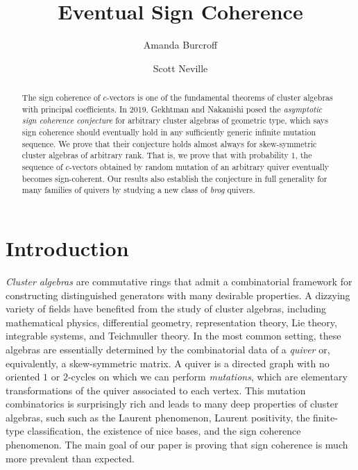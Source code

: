 \documentclass[12pt]{amsart}
\title{Eventual Sign Coherence}
\author{Amanda Burcroff}
\author{Scott Neville}
\theoremstyle{definition}
\theoremstyle{remark}
\numberwithin{equation}{section}
\begin{document}
\begin{abstract} The sign coherence of $c$-vectors is one of the fundamental theorems of cluster algebras with principal coefficients.  In 2019, Gekhtman and Nakanishi posed the \emph{asymptotic sign coherence conjecture} for arbitrary cluster algebras of geometric type, which says sign coherence should eventually hold in any sufficiently generic infinite mutation sequence.  
We prove that their conjecture holds almost always for skew-symmetric cluster algebras of arbitrary rank.  That is, we prove that with probability $1$, the sequence of $c$-vectors obtained by random mutation of an arbitrary  quiver eventually becomes sign-coherent. 
Our results also establish the conjecture in full generality for many families of quivers by studying a new class of \emph{brog} quivers.
\end{abstract}



\maketitle


\section{Introduction}


\emph{Cluster algebras} are commutative rings that admit a combinatorial framework for constructing distinguished generators with many desirable properties.  A dizzying variety of fields have benefited from the study of cluster algebras, including mathematical physics, differential geometry, representation theory, Lie theory, integrable systems, and Teichmuller theory.  In the most common setting, these algebras are essentially determined by the combinatorial data of a \emph{quiver} or, equivalently, a skew-symmetric matrix.  A quiver is a directed graph with no oriented $1$ or $2$-cycles on which we can perform \emph{mutations}, which are elementary transformations of the quiver associated to each vertex.  
This mutation combinatorics is surprisingly rich and leads to many deep properties of cluster algebras, such such as the Laurent phenomenon, Laurent positivity, the finite-type classification, the existence of nice bases, and the sign coherence phenomenon.  The main goal of our paper is proving that sign coherence is much more prevalent than expected.
\end{document}
